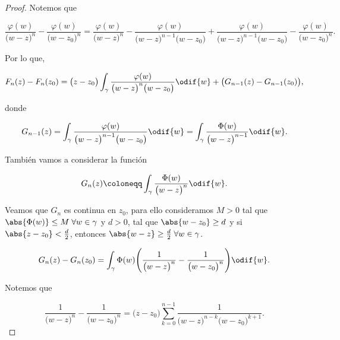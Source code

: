 \documentclass[../main.tex]{subfiles}
\begin{document}
\begin{proof}
    Notemos que

    \begin{equation*}
        \dfrac{\varphi(w)}{\bigl(w - z\bigr)^{n}} - \dfrac{\varphi(w)}{\bigl(w -
        z_{0}\bigr)^{n}} = \dfrac{\varphi(w)}{\bigl(w - z\bigr)^{n}} -
        \dfrac{\varphi(w)}{\bigl(w - z\bigr)^{n - 1}\bigl(w - z_{0}\bigr)} +
        \dfrac{\varphi(w)}{\bigl(w - z\bigr)^{n - 1}\bigl(w - z_{0}\bigr)} -
        \dfrac{\varphi(w)}{\bigl(w - z_{0}\bigr)^{n}}.
    \end{equation*}

    Por lo que,

    \begin{equation*}
        F_{n}(z) - F_{n}(z_{0}) = \bigl(z -
        z_{0}\bigr)\int_{\gamma}^{}\dfrac{\varphi(w)}{\bigl(w - z\bigr)^{n}\bigl(w -
        z_{0}\bigr)}\odif{w} + \bigl(G_{n - 1}(z) - G_{n - 1}(z_{0})\bigr),
    \end{equation*}

    donde

    \begin{equation*}
        G_{n - 1}(z) = \int_{\gamma}^{}\dfrac{\varphi(w)}{\bigl(w -
            z\bigr)^{n - 1}\bigl(w -
        z_{0}\bigr)}\odif{w} = \int_{\gamma}^{}\dfrac{\Phi(w)}{\bigl(w - z\bigr)^{n -
        1}}\odif{w}.
    \end{equation*}

    También vamos a considerar la función

    \begin{equation*}
        G_{n}(z) \coloneqq \int_{\gamma}^{}\dfrac{\Phi(w)}{\bigl(w -
        z\bigr)^{n}}\odif{w}.
    \end{equation*}

    Veamos que \(G_{n}\) es continua en \(z_{0}\), para ello consideramos \(M
    > 0\) tal que
    \(\abs{\Phi(w)} \leq M\; \forall w\in \gamma\) y \(d > 0\), tal que
    \(\abs{w - z_{0}}
    \geq d\) y si \(\abs{z - z_{0}} < \tfrac{d}{2}\), entonces \(\abs{w - z} \geq
    \tfrac{d}{2}\; \forall w\in \gamma\).

    \begin{equation*}
        G_{n}(z) - G_{n}(z_{0}) = \int_{\gamma}^{}\Phi(w)\Biggl(\dfrac{1}{\bigl(w -
        z\bigr)^{n}} - \dfrac{1}{\bigl(w - z_{0}\bigr)^{n}}\Biggr)\odif{w}.
    \end{equation*}

    Notemos que

    \begin{equation*}
        \dfrac{1}{\bigl(w - z\bigr)^{n}} - \dfrac{1}{\bigl(w -
        z_{0}\bigr)^{n}} = \bigl(z -
        z_{0}\bigr)\sum_{k = 0}^{n - 1}\dfrac{1}{\bigl(w - z\bigr)^{n - k}\bigl(w -
        z_{0}\bigr)^{k + 1}}.
    \end{equation*}


\end{proof}
\end{document}
